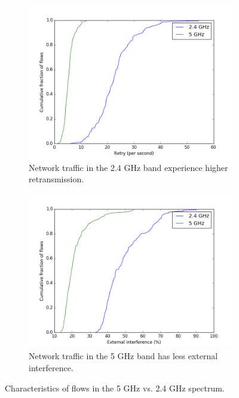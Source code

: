 \begin{figure}
\hspace*{\fill} %
\begin{subfigure}{0.45\textwidth}
\includegraphics[width=\linewidth]{figure/retries(2g_vs_5g).png}
\caption{Network traffic in the 2.4 GHz band experience higher retransmission.}
\label{fig:retries}
\end{subfigure}
\hspace*{\fill} %
\begin{subfigure}{0.5\textwidth}
\includegraphics[width=\linewidth]{figure/external_interference(2g_vs_5g).png}
\caption{Network traffic in the 5 GHz band has less external interference.}
\label{fig:interference}
\end{subfigure}
\caption{Characteristics of flows in the 5 GHz vs. 2.4 GHz spectrum.}
\label{fig:5gvs2g}
\end{figure}

